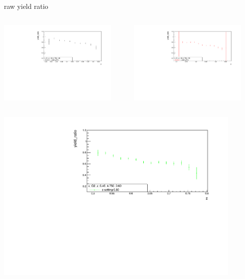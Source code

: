 \begin{frame}{raw yield ratio}
\begin{columns}
\begin{column}[T]{0.5\textwidth}
\includegraphics[width = 0.9\textwidth]{results/yield/statistics/x_Q2_z_0.45_4.750_0.40_ratio.pdf}
\end{column}
\begin{column}[T]{0.5\textwidth}
\includegraphics[width = 0.9\textwidth]{results/yield/statistics/x_Q2_z_0.45_4.750_0.50_ratio.pdf}
\end{column}
\end{columns}
\begin{columns}
\begin{column}[T]{0.5\textwidth}
\includegraphics[width = 0.9\textwidth]{results/yield/statistics/x_Q2_z_0.45_4.750_0.60_ratio.pdf}

\end{column}
\end{columns}
\end{frame}
